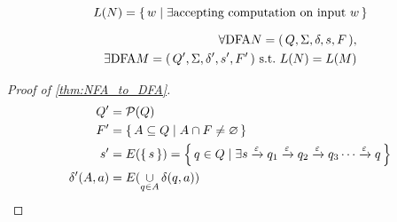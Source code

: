 \begin{definition}
    \[
        L(N) = { \left\{\, w \mid \exists \text{accepting computation on input $w$} \,\right\} }
    \]
\end{definition}

\begin{theorem}
    \label{thm:NFA_to_DFA}
    \begin{align*}
        \forall \text{\upshape DFA} { N = { \left(\,Q, \Sigma, \delta, s, F\,\right) } },  \\
        \exists \text{\upshape DFA} M = { \left(\, Q',\Sigma,\delta',s',F' \,\right) }
        \text{ s.t.\ }
        L(N) = L(M)
    \end{align*}
\end{theorem}

\begin{proof}[Proof of \autoref{thm:NFA_to_DFA}]
    \begin{align*}
        Q' &= { \mathcal{P} }(Q)  \\
        F' &= { \left\{\, A \subseteq Q \mid A \cap F \not= \varnothing \,\right\} }  \\
        s' &= E({ \left\{\,s\,\right\} }) = { \left\{\,q \in Q \mid \exists s
                                                \xrightarrow\varepsilon q_1
                                                \xrightarrow\varepsilon q_2
                                                \xrightarrow\varepsilon q_3
                                                \cdots
                                                \xrightarrow\varepsilon q
        \,\right\} }  \\
        \delta'(A, a) &= E( \operatorname*\cup_{q \in A} \delta(q,a) )
    \end{align*}
\end{proof}
